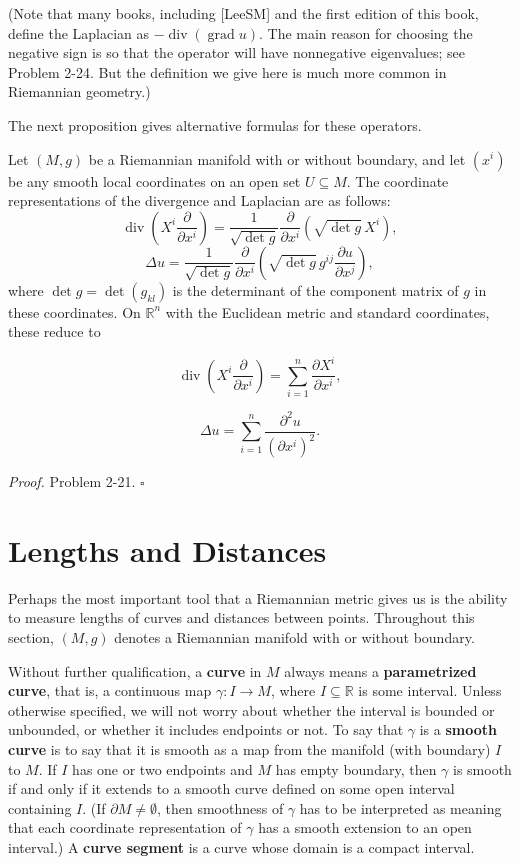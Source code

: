 (Note that many books, including [LeeSM] and the first edition of this book, define
the Laplacian as $-\operatorname{div}(\operatorname{grad} u)$. The main reason for choosing the negative sign is
so that the operator will have nonnegative eigenvalues; see Problem 2-24. But the
definition we give here is much more common in Riemannian geometry.)

The next proposition gives alternative formulas for these operators.

\begin{proposition}
\label{prop:coordinate-representations-divergence-laplacian}

Let $(M, g)$ be a Riemannian manifold with or without boundary,
and let $(x^i)$ be any smooth local coordinates on an open set $U \subseteq M$. The coordinate
representations of the divergence and Laplacian are as follows:
\[
\operatorname{div}\left(X^i \frac{\partial}{\partial x^i}\right) = \frac{1}{\sqrt{\det g}} \frac{\partial}{\partial x^i}\left(\sqrt{\det g}\, X^i\right),
\]
\[
\Delta u = \frac{1}{\sqrt{\det g}} \frac{\partial}{\partial x^i}\left(\sqrt{\det g}\, g^{ij} \frac{\partial u}{\partial x^j}\right),
\]
where $\det g = \det(g_{kl})$ is the determinant of the component matrix of $g$ in these coordinates. On $\mathbb{R}^n$ with the Euclidean metric and standard coordinates, these reduce to

\[
\operatorname{div}\left(X^i \frac{\partial}{\partial x^i}\right) = \sum_{i=1}^n \frac{\partial X^i}{\partial x^i},
\]

\[
\Delta u = \sum_{i=1}^n \frac{\partial^2 u}{(\partial x^i)^2}.
\]
\end{proposition}

\textit{Proof.} Problem 2-21. \hfill $\square$

\section{Lengths and Distances}

Perhaps the most important tool that a Riemannian metric gives us is the ability to measure lengths of curves and distances between points. Throughout this section, $(M, g)$ denotes a Riemannian manifold with or without boundary.

Without further qualification, a \textbf{curve} in $M$ always means a \textbf{parametrized curve}, that is, a continuous map $\gamma: I \to M$, where $I \subseteq \mathbb{R}$ is some interval. Unless otherwise specified, we will not worry about whether the interval is bounded or unbounded, or whether it includes endpoints or not. To say that $\gamma$ is a \textbf{smooth curve} is to say that it is smooth as a map from the manifold (with boundary) $I$ to $M$. If $I$ has one or two endpoints and $M$ has empty boundary, then $\gamma$ is smooth if and only if it extends to a smooth curve defined on some open interval containing $I$. (If $\partial M \neq \emptyset$, then smoothness of $\gamma$ has to be interpreted as meaning that each coordinate representation of $\gamma$ has a smooth extension to an open interval.) A \textbf{curve segment} is a curve whose domain is a compact interval.

